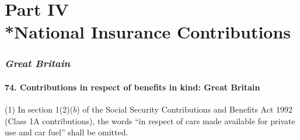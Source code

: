 \documentclass[12pt,a4paper]{article}
\begin{document}
%
%
%
%
%


\part[Part IV --- National Insurance Contributions]{Part IV\\*National Insurance Contributions}

\renewcommand\parthead{--- Part IV}

\section{\itshape Great Britain}

\subsection{74. Contributions in respect of benefits in kind: Great Britain}

(1) In section 1(2)($b$)  of the Social Security Contributions and Benefits Act 1992 (Class 1A contributions), the words “in respect of cars made available for private use and car fuel” shall be omitted.
\end{document}
